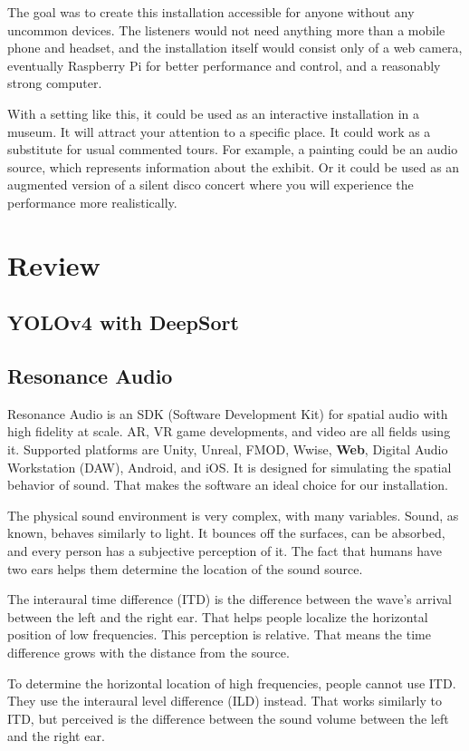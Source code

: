 \documentclass{ctuthesis}
\begin{document}
The goal was to create this installation accessible for anyone without any uncommon devices. The listeners would not need anything more than a mobile phone and headset, and the installation itself would consist only of a web camera, eventually Raspberry Pi for better performance and control, and a reasonably strong computer. 

With a setting like this, it could be used as an interactive installation in a museum. It will attract your attention to a specific place. It could work as a substitute for usual commented tours. For example, a painting could be an audio source, which represents information about the exhibit. 
Or it could be used as an augmented version of a silent disco concert where you will experience the performance more realistically.

\chapter{Review}
\section{YOLOv4 with DeepSort}


\section{Resonance Audio}
Resonance Audio is an SDK (Software Development Kit) for spatial audio with high fidelity at scale. AR, VR game developments, and video are all fields using it. Supported platforms are Unity, Unreal, FMOD, Wwise, \textbf{Web}, Digital Audio Workstation (DAW), Android, and iOS. It is designed for simulating the spatial behavior of sound. That makes the software an ideal choice for our installation. 

The physical sound environment is very complex, with many variables. Sound, as known, behaves similarly to light. It bounces off the surfaces, can be absorbed, and every person has a subjective perception of it. The fact that humans have two ears helps them determine the location of the sound source. 

The interaural time difference (ITD) is the difference between the wave's arrival between the left and the right ear. That helps people localize the horizontal position of low frequencies. This perception is relative. That means the time difference grows with the distance from the source.

To determine the horizontal location of high frequencies, people cannot use ITD. They use the interaural level difference (ILD) instead. That works similarly to ITD, but perceived is the difference between the sound volume between the left and the right ear.
\end{document}
